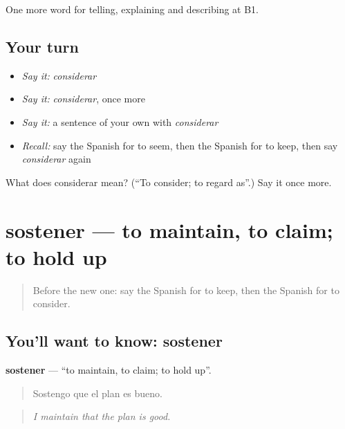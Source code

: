 \begin{grammarlens}[title={What you've built}]
One more word for telling, explaining and describing at B1.
\end{grammarlens}

\subsection*{Your turn}
\begin{itemize}
\raggedright
  \item \emph{Say it:} \emph{considerar}
  \item \emph{Say it:} \emph{considerar}, once more
  \item \emph{Say it:} a sentence of your own with \emph{considerar}
  \item \emph{Recall:} say the Spanish for to seem, then the Spanish for to keep, then say \emph{considerar} again
\end{itemize}

\begin{tcolorbox}[breakable,colback=teal!4,colframe=teal!35!black,title={Before you move on}]
What does considerar mean? (\textquotedblleft{}To consider; to regard as\textquotedblright{}.) Say it once more.
\end{tcolorbox}
\section[sostener]{sostener — to maintain, to claim; to hold up}

\label{lesson:ES-C576-sostener}



\begin{quote}
Before the new one: say the Spanish for to keep, then the Spanish for to consider.
\end{quote}

\subsection*{You'll want to know: sostener}
\textbf{sostener} — \textquotedblleft{}to maintain, to claim; to hold up\textquotedblright{}.

\begin{quote}
Sostengo que el plan es bueno.
\end{quote}

\begin{quote}
\emph{I maintain that the plan is good.}
\end{quote}

